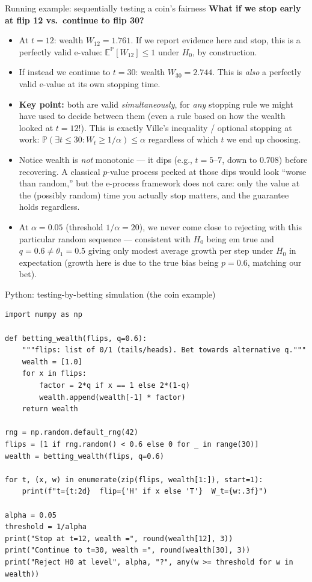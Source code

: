 \documentclass[aspectratio=169,10pt]{beamer}
\begin{document}
\begin{frame}[allowframebreaks]{Running example: sequentially testing a coin's fairness}
\textbf{What if we stop early at flip 12 vs.\ continue to flip 30?}
\begin{itemize}
\item At $t=12$: wealth $W_{12} = 1.761$. If we report evidence here and stop, this is a perfectly valid e-value:
$\mathbb E^{\mathbb P}[W_{12}] \le 1$ under $H_0$, by construction.
\item If instead we continue to $t=30$: wealth $W_{30} = 2.744$. This is \emph{also} a perfectly valid e-value at
its own stopping time.
\item \textbf{Key point:} both are valid \emph{simultaneously}, for \emph{any} stopping rule we might have used to
decide between them (even a rule based on how the wealth looked at $t=12$!). This is exactly Ville's inequality /
optional stopping at work: $\mathbb P(\exists t \le 30 : W_t \ge 1/\alpha) \le \alpha$ regardless of which $t$ we
end up choosing.
\item Notice wealth is \emph{not} monotonic --- it dips (e.g., $t=5$--$7$, down to $0.708$) before recovering. A
classical $p$-value process peeked at those dips would look ``worse than random,'' but the e-process framework
does not care: only the value at the (possibly random) time you actually stop matters, and the guarantee holds
regardless.
\item At $\alpha = 0.05$ (threshold $1/\alpha = 20$), we never come close to rejecting with this particular random
sequence --- consistent with $H_0$ being em true and $q=0.6\ne \theta_1=0.5$ giving only modest average growth
per step under $H_0$ in expectation (growth here is due to the true bias being $p=0.6$, matching our bet).
\end{itemize}

\end{frame}

\begin{frame}[fragile]{Python: testing-by-betting simulation (the coin example)}

\begin{lstlisting}
import numpy as np

def betting_wealth(flips, q=0.6):
    """flips: list of 0/1 (tails/heads). Bet towards alternative q."""
    wealth = [1.0]
    for x in flips:
        factor = 2*q if x == 1 else 2*(1-q)
        wealth.append(wealth[-1] * factor)
    return wealth

rng = np.random.default_rng(42)
flips = [1 if rng.random() < 0.6 else 0 for _ in range(30)]
wealth = betting_wealth(flips, q=0.6)

for t, (x, w) in enumerate(zip(flips, wealth[1:]), start=1):
    print(f"t={t:2d}  flip={'H' if x else 'T'}  W_t={w:.3f}")

alpha = 0.05
threshold = 1/alpha
print("Stop at t=12, wealth =", round(wealth[12], 3))
print("Continue to t=30, wealth =", round(wealth[30], 3))
print("Reject H0 at level", alpha, "?", any(w >= threshold for w in wealth))
\end{lstlisting}

\end{frame}
\end{document}
